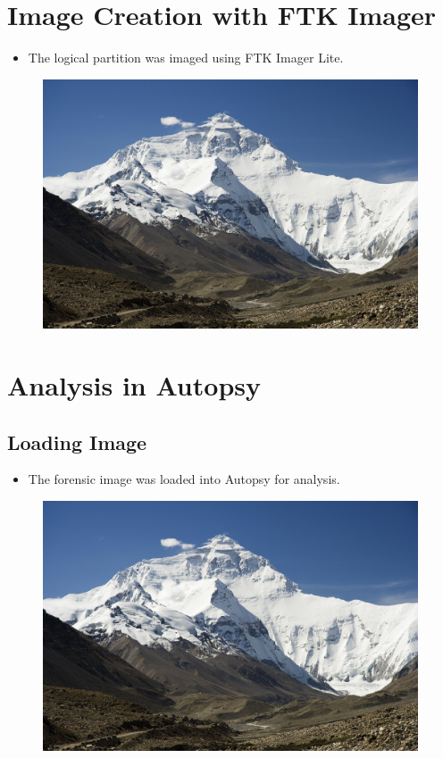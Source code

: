 \documentclass[11pt]{article}
\begin{document}
\section{Image Creation with FTK Imager}
\begin{itemize}
    \item The logical partition was imaged using FTK Imager Lite.
\end{itemize}
\begin{figure}[H]
    \centering
    \includegraphics[width=0.99\textwidth]{everest.jpg}
    \caption{}
    \label{fig:1}
\end{figure}


\section{Analysis in Autopsy}

\subsection{Loading Image}
\begin{itemize}
    \item The forensic image was loaded into Autopsy for analysis.
\end{itemize}
\begin{figure}[H]
    \centering
    \includegraphics[width=0.99\textwidth]{everest.jpg}
    \caption{}
    \label{fig:1}
\end{figure}
\end{document}
